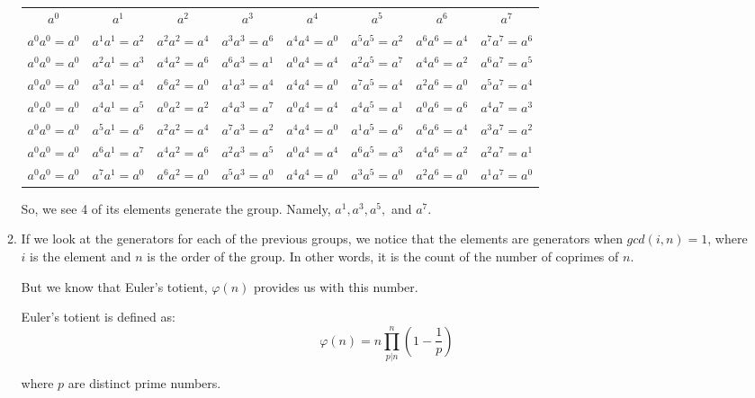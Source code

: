 \documentclass[12pt,letterpaper]{article}
\begin{document}
\begin{enumerate}
\begin{enumerate}
          \begin{tabular}{| c | c | c | c | c | c | c | c |}
            \hline
            $a^0$          & $a^1$          & $a^2$          & $a^3$          & $a^4$          & $a^5$          & $a^6$          & $a^7$          \\
            $a^0a^0 = a^0$ & $a^1a^1 = a^2$ & $a^2a^2 = a^4$ & $a^3a^3 = a^6$ & $a^4a^4 = a^0$ & $a^5a^5 = a^2$ & $a^6a^6 = a^4$ & $a^7a^7 = a^6$ \\
            $a^0a^0 = a^0$ & $a^2a^1 = a^3$ & $a^4a^2 = a^6$ & $a^6a^3 = a^1$ & $a^0a^4 = a^4$ & $a^2a^5 = a^7$ & $a^4a^6 = a^2$ & $a^6a^7 = a^5$ \\
            $a^0a^0 = a^0$ & $a^3a^1 = a^4$ & $a^6a^2 = a^0$ & $a^1a^3 = a^4$ & $a^4a^4 = a^0$ & $a^7a^5 = a^4$ & $a^2a^6 = a^0$ & $a^5a^7 = a^4$ \\
            $a^0a^0 = a^0$ & $a^4a^1 = a^5$ & $a^0a^2 = a^2$ & $a^4a^3 = a^7$ & $a^0a^4 = a^4$ & $a^4a^5 = a^1$ & $a^0a^6 = a^6$ & $a^4a^7 = a^3$ \\
            $a^0a^0 = a^0$ & $a^5a^1 = a^6$ & $a^2a^2 = a^4$ & $a^7a^3 = a^2$ & $a^4a^4 = a^0$ & $a^1a^5 = a^6$ & $a^6a^6 = a^4$ & $a^3a^7 = a^2$ \\
            $a^0a^0 = a^0$ & $a^6a^1 = a^7$ & $a^4a^2 = a^6$ & $a^2a^3 = a^5$ & $a^0a^4 = a^4$ & $a^6a^5 = a^3$ & $a^4a^6 = a^2$ & $a^2a^7 = a^1$ \\
            $a^0a^0 = a^0$ & $a^7a^1 = a^0$ & $a^6a^2 = a^0$ & $a^5a^3 = a^0$ & $a^4a^4 = a^0$ & $a^3a^5 = a^0$ & $a^2a^6 = a^0$ & $a^1a^7 = a^0$ \\
            \hline
          \end{tabular}

          So, we see 4 of its elements generate the group.
          Namely, $a^1, a^3, a^5,$ and $a^7$.

        \item
          If we look at the generators for each of the previous groups,
          we notice that the elements are generators when $gcd(i, n) = 1$,
          where $i$ is the element and $n$ is the order of the group.
          In other words, it is the count of the number of coprimes of $n$.

          But we know that Euler's totient, $\varphi(n)$ provides us with this number.

          Euler's totient is defined as:
          \[\varphi(n) = n\prod_{p|n}^n\left(1-\frac{1}{p}\right)\]

          where $p$ are distinct prime numbers.


\end{enumerate}
\end{enumerate}
\end{document}
